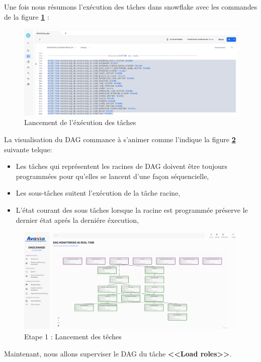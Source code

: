 \par Une fois nous résumons l'exécution des tâches dans snowflake avec les commandes de la figure \textbf{\ref{fig:resume}} :
\begin{figure}[H]
    \centering
    \includegraphics[width =1\linewidth]{img/captures/dag/resume.png}
    \caption{Lancement de l'éxécution des tâches}
    \label{fig:resume}
\end{figure}
\par La visualisation du DAG commance à s'animer comme l'indique la figure \textbf{\ref{fig:sus}} suivante telque:
\begin{itemize}
    \item Les tâches qui représentent les racines de DAG doivent être toujours programmées pour qu'elles se lancent d'une façon séquencielle,
    \item Les sous-tâches suitent l'exécution de la tâche racine,
    \item L'état courant des sous tâches lorsque la racine est programmée préserve le dernier état aprés la derniére éxecution,
\end{itemize}
\begin{figure}[H]
    \centering
    \includegraphics[width =1\linewidth]{img/captures/dag/scheduled.png}
    \caption{Etape 1 : Lancement des têches}
    \label{fig:sus}
\end{figure}
\par Maintenant, nous allons superviser le DAG du tâche \textbf{<<Load roles>>}. \\
